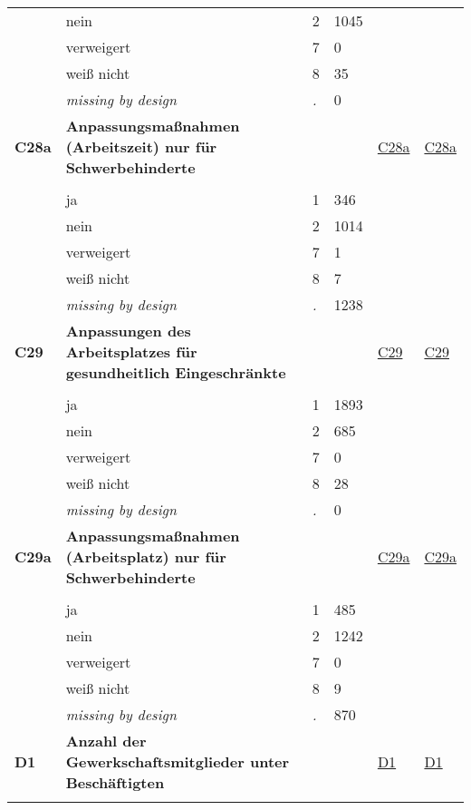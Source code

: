 \begin{longtable}{| L{2.45cm} | L{6cm} | C{1.5cm} | R{1cm} | C{2.25cm} | C{2.25cm} |}
   & nein & 2 & 1045 &  &  \\ 
   & verweigert & 7 & 0 &  &  \\ 
   & weiß nicht & 8 & 35 &  &  \\ 
   & \textit{missing by design} & \textit{.} & 0 &  &  \\ 
   \midrule
\textbf{C28a}\label{var:C28a} & \textbf{Anpassungsmaßnahmen (Arbeitszeit) nur für Schwerbehinderte} &  &  & \hyperref[C28a]{C28a} & \hyperref[var:suf:C28a]{C28a} \\ 
   &  &  &  &  &  \\ 
   & ja & 1 & 346 &  &  \\ 
   & nein & 2 & 1014 &  &  \\ 
   & verweigert & 7 & 1 &  &  \\ 
   & weiß nicht & 8 & 7 &  &  \\ 
   & \textit{missing by design} & \textit{.} & 1238 &  &  \\ 
   \midrule
\textbf{C29}\label{var:C29} & \textbf{Anpassungen des Arbeitsplatzes für gesundheitlich Eingeschränkte} &  &  & \hyperref[C29]{C29} & \hyperref[var:suf:C29]{C29} \\ 
   &  &  &  &  &  \\ 
   & ja & 1 & 1893 &  &  \\ 
   & nein & 2 & 685 &  &  \\ 
   & verweigert & 7 & 0 &  &  \\ 
   & weiß nicht & 8 & 28 &  &  \\ 
   & \textit{missing by design} & \textit{.} & 0 &  &  \\ 
   \midrule
\textbf{C29a}\label{var:C29a} & \textbf{Anpassungsmaßnahmen (Arbeitsplatz) nur für Schwerbehinderte} &  &  & \hyperref[C29a]{C29a} & \hyperref[var:suf:C29a]{C29a} \\ 
   &  &  &  &  &  \\ 
   & ja & 1 & 485 &  &  \\ 
   & nein & 2 & 1242 &  &  \\ 
   & verweigert & 7 & 0 &  &  \\ 
   & weiß nicht & 8 & 9 &  &  \\ 
   & \textit{missing by design} & \textit{.} & 870 &  &  \\ 
   \midrule
\textbf{D1}\label{var:D1} & \textbf{Anzahl der Gewerkschaftsmitglieder unter Beschäftigten} &  &  & \hyperref[D1]{D1} & \hyperref[var:suf:D1]{D1} \\ 
   &  &  &  &  &  \\ 

\end{longtable}
